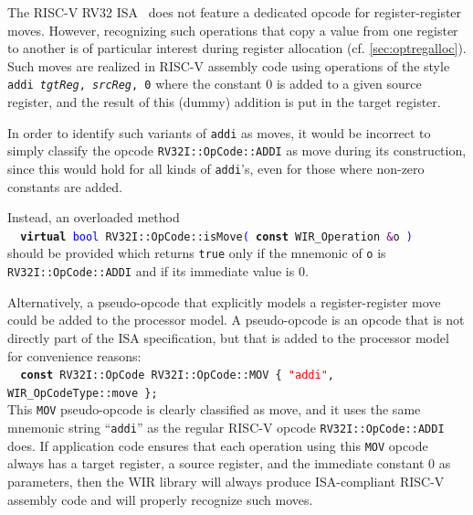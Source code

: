 \begin{wirExample}%
The RISC-V RV32 \gls{ISA}~\cite{riscv17} does not feature a dedicated opcode for register-register moves.
However, recognizing such operations that copy a value from one register to another is of particular interest during register allocation (cf. \cref{sec:optregalloc}).
Such moves are realized in RISC-V assembly code using operations of the style \texttt{addi \emph{tgtReg}, \emph{srcReg}, 0} where the constant 0 is added to a given source register, and the result of this (dummy) addition is put in the target register.

In order to identify such variants of \texttt{addi} as moves, it would be incorrect to simply classify the opcode \texttt{RV32I::OpCode::ADDI} as move during its construction, since this would hold for all kinds of \texttt{addi}'s, even for those where non-zero constants are added.

Instead, an overloaded method \\
\verb|  |\texttt{\textbf{virtual} \textcolor{blue}{bool} RV32I::OpCode::isMove\textcolor{blue}{(} \textbf{const} WIR\_Operation \textcolor{purple}{\&}o \textcolor{blue}{)}} \\
should be provided which returns \texttt{true} only if the mnemonic of \texttt{o} is \texttt{RV32I::OpCode::ADDI} and if its immediate value is 0.

Alternatively, a pseudo-opcode that explicitly models a register-register move could be added to the processor model.
A pseudo-opcode is an opcode that is not directly part of the \gls{ISA} specification, but that is added to the processor model for convenience reasons: \\
\verb|  |\texttt{\textbf{const} RV32I::OpCode RV32I::OpCode::MOV \{ \textcolor{red}{"addi"}, WIR\_OpCodeType::move \}; } \\
This \texttt{MOV} pseudo-opcode is clearly classified as move, and it uses the same mnemonic string ``\texttt{addi}'' as the regular RISC-V opcode \texttt{RV32I::OpCode::ADDI} does.
If application code ensures that each operation using this \texttt{MOV} opcode always has a target register, a source register, and the immediate constant 0 as parameters, then the \gls{WIR} library will always produce \gls{ISA}-compliant RISC-V assembly code and will properly recognize such moves.
\end{wirExample}


